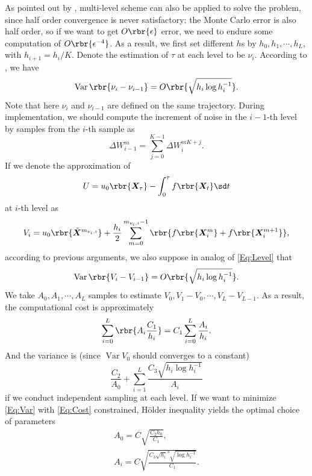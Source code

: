 \documentclass[english, nochinese]{pnote}
\DeclareMathOperator\opvar{\mathrm{Var}}
\begin{document}
As pointed out by \parencite{higham_mean_2013}, multi-level scheme can also be applied to solve the problem, since half order convergence is never satisfactory: the Monte Carlo error is also half order, so if we want to get $ O \rbr{\epsilon} $ error, we need to endure some computation of $ O \rbr{\epsilon^{-4}} $. As a result, we first set different $h$s by $ h_0, h_1, \cdots, h_L $, with $ h_{ i + 1 } = h_i / K $. Denote the estimation of $\tau$ at each level to be $\nu_i$. According to \parencite{higham_mean_2013}, we have
\begin{equation} \label{Eq:Level}
\opvar \rbr{ \nu_i - \nu_{ i - 1 } } = O \rbr{\sqrt{ h_i \log h_i^{-1} }}.
\end{equation}
Note that here $\nu_i$ and $ \nu_{ i - 1 } $ are defined on the same trajectory. During implementation, we should compute the increment of noise in the $ i - 1 $-th level by samples from the $i$-th sample as
\begin{equation}
\Delta W^{m}_{ i - 1 } = \sum_{ j = 0 }^{ K - 1 } \Delta W^{ m K + j }_i.
\end{equation}
If we denote the approximation of
\begin{equation}
U = u_0 \rbr{\bm{X}_{\tau}} - \int_0^{\tau} f \rbr{\bm{X}_t} \sd t
\end{equation}
at $i$-th level as
\begin{equation}
V_i = u_0 \rbr{\tilde{\bm{X}}^{m_{ \nu_i, i }}} + \frac{h_i}{2} \sum_{ m = 0 }^{ m_{ \nu_i, i } - 1 } \rbr{ f \rbr{\bm{X}_i^{m}} + f \rbr{\bm{X}_i^{ m + 1 }}},
\end{equation}
according to previous arguments, we also suppose in analog of \eqref{Eq:Level} that
\begin{equation} \label{Eq:Asy}
\opvar \rbr{ V_i - V_{ i - 1 } } = O \rbr{\sqrt{ h_i \log h_i^{-1} }}.
\end{equation}
We take $ A_0, A_1, \cdots, A_L $ samples to estimate $ V_0, V_1 - V_0, \cdots, V_L - V_{ L - 1 } $. As a result, the computational cost is approximately
\begin{equation} \label{Eq:Cost}
\sum_{ i = 0 }^L \rbr{ A_i \frac{C_1}{h_i} } = C_1 \sum_{ i = 0 }^L \frac{A_i}{h_i}.
\end{equation}
And the variance is (since $ \opvar V_0 $ should converges to a constant)
\begin{equation} \label{Eq:Var}
\frac{C_2}{A_0} + \sum_{ i = 1 }^L \frac{ C_3 \sqrt{ h_i \log h_i^{-1} } }{A_i}
\end{equation}
if we conduct independent sampling at each level. If we want to minimize \eqref{Eq:Var} with \eqref{Eq:Cost} constrained, H\"older inequality yields the optimal choice of parameters
\begin{gather} \label{Eq:Strat}
A_0 = C \sqrt{\frac{ C_2 h_0 }{C_1}}, \\
A_i = C \sqrt{\frac{ C_3 \sqrt{h_i}^3 \sqrt{ \log h_i^{-1} } }{C_1}}.
\end{gather}
\end{document}
